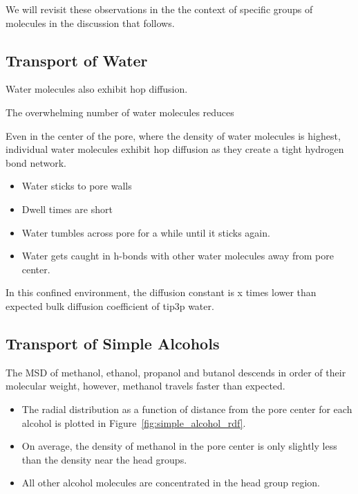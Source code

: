\documentclass{article}
\begin{document}
  We will revisit these observations in the the context of specific groups of 
  molecules in the discussion that follows.


  \subsection*{Transport of Water}

  Water molecules also exhibit hop diffusion.
  
  The overwhelming number of water molecules reduces

  Even in the center of the pore, where the density of water molecules is
  highest, individual water molecules exhibit hop diffusion as they create a
  tight hydrogen bond network.
  \begin{itemize}
	\item Water sticks to pore walls
	\item Dwell times are short
	\item Water tumbles across pore for a while until it sticks again. 
	\item Water gets caught in h-bonds with other water molecules away
	from pore center.
  \end{itemize}

  In this confined environment, the diffusion constant is x times lower than
  expected bulk diffusion coefficient of tip3p water.

  
  \subsection*{Transport of Simple Alcohols}

  The MSD of methanol, ethanol, propanol and butanol descends in order of 
  their molecular weight, however, methanol travels faster than expected.  %
  \begin{itemize}  
    \item The radial distribution as a function of distance from the pore center
    for each alcohol is plotted in Figure~\ref{fig:simple_alcohol_rdf}.
    \item On average, the density of methanol in the pore center is only slightly
    less than the density near the head groups.
    \item All other alcohol molecules are concentrated in the head group region.
  \end{itemize}
  
\end{document}

